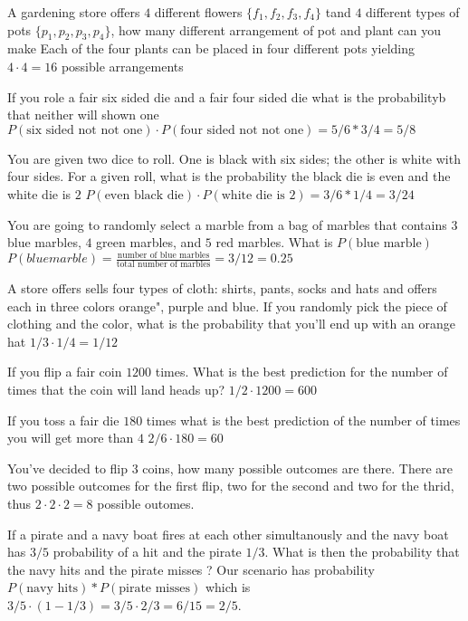\begin{ExerciseList}


\Exercise A gardening store offers $4 $ different flowers $\{f_1, f_2, f_3, f_4\}$ tand $4$ different types of pots $\{p_1, p_2, p_3, p_4\}$, how many different arrangement of pot and plant can you make
\Answer Each of the four plants can be placed in four different pots yielding $4 \cdot 4 = 16$ possible arrangements

\Exercise If you role a fair six sided die and a fair four sided die what is the probabilityb that neither will shown one
\Answer $P(\text{six sided not not one}) \cdot P(\text{four sided not not one}) = 5/6 * 3/4 = 5/8$

\Exercise You are given two dice to roll. One is black with six sides; the other is white with four sides. For a given roll, what is the probability the black die is even and the white die is $2$
\Answer $P(\text{even black die}) \cdot P(\text{white die is 2}) = 3/6 * 1/4 = 3/24$

\Exercise You are going to randomly select a marble from a bag of marbles that contains $3$ blue marbles, $4$ green marbles, and $5$ red marbles. What is $P(\text{blue marble})$
\Answer $P(blue marble) = \frac{\text{number of blue marbles}}{\text{total number of marbles}} = 3/12 = 0.25$

\Exercise A store offers sells four types of cloth: shirts, pants, socks and hats and offers each in three colors orange", purple and blue. If you randomly pick the piece of clothing and the color, what is the probability that you'll end up with an orange hat
\Answer $1/3 \cdot 1/4 = 1/12$

\Exercise If you flip a fair coin $1200$ times. What is the best prediction for the number of times that the coin will land heads up?
\Answer $1/2 \cdot 1200 = 600$

\Exercise If you toss a fair die $180$ times what is the best prediction of the number of times you will get more than $4$
\Answer $2/6 \cdot 180 = 60$

\Exercise You've decided to flip $3$ coins, how many possible outcomes are there.
\Answer There are two possible outcomes for the first flip, two for the second and two for the thrid, thus $2 \cdot 2 \cdot 2 = 8$ possible outomes.

\Exercise If a pirate and a navy boat fires at each other simultanously and the navy boat has $3/5$ probability of a hit and the pirate $1/3$. What is then the probability that the navy hits and the pirate misses ?
\Answer Our scenario has probability $P(\text{navy hits}) * P(\text{pirate misses})$ which is $3/5 \cdot (1 - 1/3) = 3/5 \cdot 2/3 = 6/15 = 2/5$.


\end{ExerciseList}
